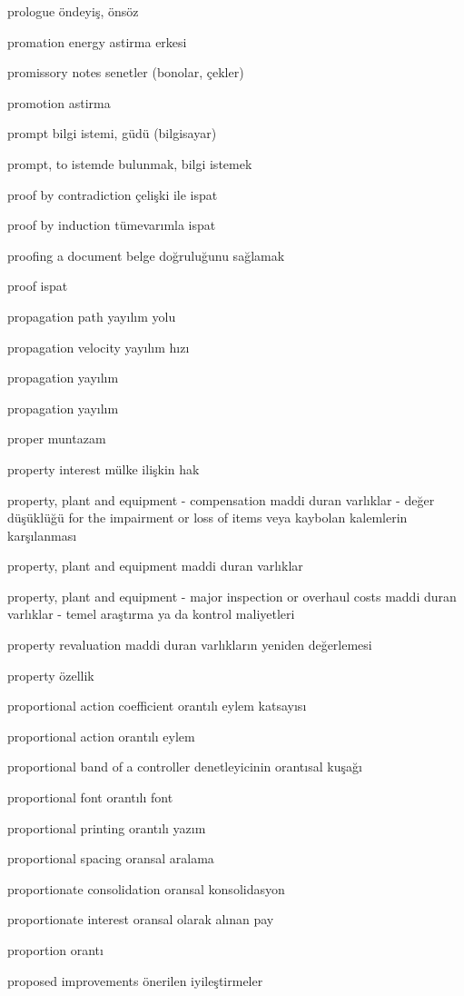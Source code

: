 \documentclass[12pt,fleqn]{article}\usepackage{../../common}
\begin{document}
prologue öndeyiş, önsöz

promation energy astirma erkesi

promissory notes senetler (bonolar, çekler)

promotion astirma

prompt bilgi istemi, güdü (bilgisayar)

prompt, to istemde bulunmak, bilgi istemek

proof by contradiction çelişki ile ispat

proof by induction tümevarımla ispat

proofing a document belge doğruluğunu sağlamak

proof ispat

propagation path yayılım yolu

propagation velocity yayılım hızı

propagation yayılım

propagation yayılım

proper muntazam

property interest mülke ilişkin hak

property, plant and equipment - compensation maddi duran varlıklar - değer düşüklüğü for the impairment or loss of items veya kaybolan kalemlerin karşılanması

property, plant and equipment maddi duran varlıklar

property, plant and equipment - major inspection or overhaul costs maddi duran varlıklar - temel araştırma ya da kontrol maliyetleri

property revaluation maddi duran varlıkların yeniden değerlemesi

property özellik

proportional action coefficient orantılı eylem katsayısı

proportional action orantılı eylem

proportional band of a controller denetleyicinin orantısal kuşağı

proportional font orantılı font

proportional printing orantılı yazım

proportional spacing oransal aralama

proportionate consolidation oransal konsolidasyon

proportionate interest oransal olarak alınan pay

proportion orantı

proposed improvements önerilen iyileştirmeler
\end{document}

